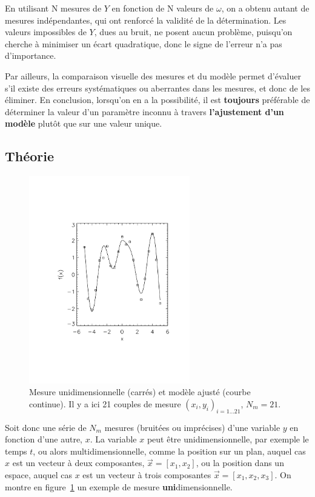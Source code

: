 \documentclass[main.tex]{subfiles}
\begin{document}
En utilisant N mesures de $Y$ en fonction de N valeurs de $\omega$, on a obtenu autant de mesures indépendantes, qui ont renforcé la validité de la détermination. Les valeurs impossibles de $Y$, dues au bruit, ne posent aucun problème, puisqu'on cherche à minimiser un écart quadratique, donc le signe de l'erreur n'a pas d'importance.

Par ailleurs, la comparaison visuelle des mesures et du modèle permet d'évaluer s'il existe des erreurs systématiques ou aberrantes dans les mesures, et donc de les éliminer. En conclusion, lorsqu'on en a la possibilité, il est \textbf{toujours} préférable de déterminer la valeur d'un paramètre inconnu à travers \textbf{l'ajustement d'un modèle} plutôt que sur une valeur unique.

\subsection{Théorie}

\begin{figure}
    \centering
    \vspace{-5mm}
    \includegraphics[width=70mm]{assets/figures/exemple1D.pdf}
    \caption{Mesure unidimensionnelle (carrés) et modèle ajusté (courbe continue). Il y a ici 21 couples de mesure $(x_i,y_i)_{i=1\dots 21}$, $N_m=21$.}
    \label{fig:ex1}
\end{figure}
Soit donc une série de $N_m$ mesures (bruitées ou imprécises) d'une variable $y$ en fonction d'une autre, $x$. La variable $x$ peut être unidimensionnelle, par exemple le temps $t$, ou alors multidimensionnelle, comme la position sur un plan, auquel cas $x$ est un vecteur à deux composantes, $\vec{x}=[x_1,x_2]$, ou la position dans un espace, auquel cas $x$ est un vecteur à trois composantes $\vec{x}=[x_1,x_2,x_3]$. On montre en figure~\ref{fig:ex1} un exemple de mesure \textbf{uni}dimensionnelle.
\end{document}
